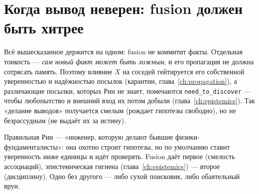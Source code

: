 \section{Когда вывод неверен: fusion должен быть хитрее}

Всё вышесказанное держится на одном: fusion не коммитит факты. Отдельная тонкость —
\emph{сам новый факт может быть ложным}, и его пропагация не должна сотрясать память.
Поэтому влияние $X$ на соседей гейтируется его собственной уверенностью и надёжностью
посылок (карантин, глава~\ref{ch:propagation}), а различающие посылки, которых Рин
не знает, помечаются \texttt{need\_to\_discover} — чтобы любопытство и внешний вход
их потом добыли (глава~\ref{ch:epistemics}). Так «делание выводов» получается
смелым (рождает гипотезы свободно), но не безрассудным (не выдаёт их за истину).

\begin{intuition}
Правильная Рин — «инженер, которую делают бывшие физики-фундаменталисты»: она
охотно строит гипотезы, но по умолчанию ставит уверенность ниже единицы и идёт
проверять. Fusion даёт первое (смелость ассоциаций), эпистемическая гигиена
(глава~\ref{ch:epistemics}) — второе (дисциплину). Одно без другого — либо сухой
поисковик, либо обаятельный врун.
\end{intuition}
